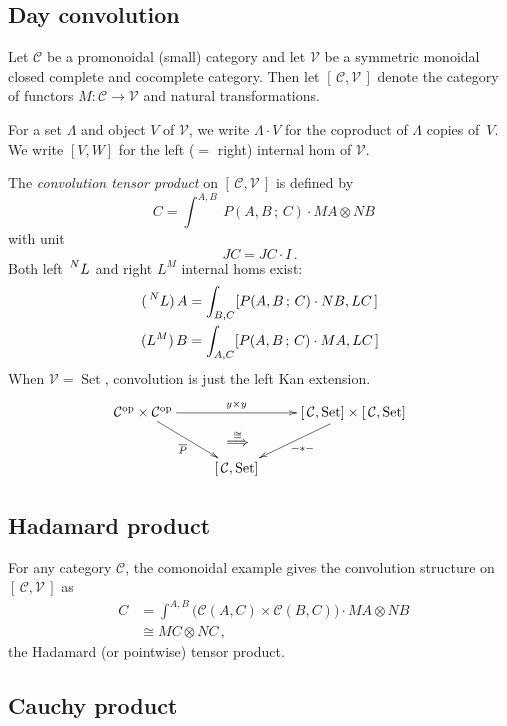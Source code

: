 \documentclass[a4paper,12pt]{article}
\theoremstyle{definition}
\theoremstyle{fact}
\theoremstyle{genquest}
\theoremstyle{step}
\newcommand{\catC}{\mathcal{C}}
\newcommand{\Set}{\operatorname{Set}}
\newcommand{\catV}{\mathcal{V}}
\newcommand{\op}{\operatorname{op}}
\newcommand{\longto}{\longrightarrow}
\newcommand{\laction}[2]{\mathord{{\let\nolimits\relax\sideset{^{#1}}{}{#2}}}}
\begin{document}
\subsection{Day convolution}

Let $\catC$  be a promonoidal (small) category and let $\catV$ be a symmetric monoidal closed complete and cocomplete category.   Then let $[\,\catC, \catV\,]$ denote the category of functors $M : \catC \longto \catV$ and natural transformations.

For a set $\Lambda$ and object $V$ of $\catV$, we write $\Lambda \cdot V$ for the coproduct of $\Lambda $ copies of~$V$.   
We write $[V,W]$ for the left ($=$ right) internal hom of $\catV$.

The \emph{convolution tensor product} on $[\,\catC,\catV\,]$ is defined by
\[
\mathop{(M \ast N)} C = \int^{A,B} \ P(A,B\,;\,C) \cdot MA \otimes NB
\]
with unit
\[
JC = JC \cdot I\,.
\]
Both left $\laction{N}{L}$ and right $L^M$ internal homs exist:
\begin{align*}
\mathop{(\laction{N}{L})} A &= \int_{B,C} [P(A,B\,;\,C) \cdot NB,LC\,]
\\
\mathop{(L^M)} B &= \int_{A,C} [P(A,B\,;\,C) \cdot MA,LC\,]
\end{align*}
When $\catV = \Set $, convolution is just the left Kan extension.
% 
\[
\xymatrix{\ar @{} [drr] |(.45)*{\stackrel{\cong}{\Longrightarrow}}  %
\catC^{\op} \times \catC^{\op} \ar[rd]_-{\overline{P}}\ar[rr]^-{y\times y}  
  && [\,\catC,  \Set ] \times [\,\catC, \Set ] \ar[ld]^-{-\ast-} \\
& [\,\catC, \Set ]  &
}\]


\subsection{Hadamard product}

For any category $\catC$, the comonoidal example gives the convolution structure on $[\,\catC,\catV\,]$ as
\begin{align*}
\mathop{(M \underline{\times} N)} C 
 &= \int^{A,B} \bigl(\catC (A,C) \times \catC(B,C)\bigr) \cdot MA \otimes NB
\\
&\cong MC \otimes NC\,,
\end{align*}
the Hadamard (or pointwise) tensor  product.


\subsection{Cauchy product}
\end{document}
